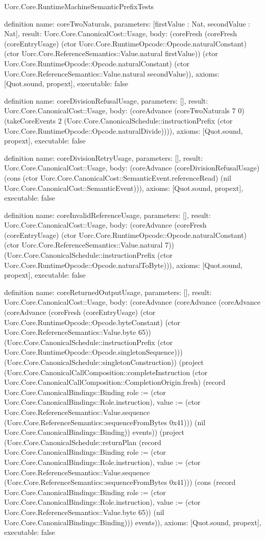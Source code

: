 \begin{lexlean}{Uorc.Core.RuntimeMachineSemanticPrefixTests}
\begin{semanticmodule}
definition{
  name: coreTwoNaturals,
  parameters: [firstValue : Nat, secondValue : Nat],
  result: Uorc.Core.CanonicalCost::Usage,
  body: (coreFresh (coreFresh (coreEntryUsage) (ctor Uorc.Core.RuntimeOpcode::Opcode.naturalConstant) (ctor Uorc.Core.ReferenceSemantics::Value.natural firstValue)) (ctor Uorc.Core.RuntimeOpcode::Opcode.naturalConstant) (ctor Uorc.Core.ReferenceSemantics::Value.natural secondValue)),
  axioms: [Quot.sound, propext],
  executable: false
}

definition{
  name: coreDivisionRefusalUsage,
  parameters: [],
  result: Uorc.Core.CanonicalCost::Usage,
  body: (coreAdvance (coreTwoNaturals 7 0) (takeCoreEvents 2 (Uorc.Core.CanonicalSchedule::instructionPrefix (ctor Uorc.Core.RuntimeOpcode::Opcode.naturalDivide)))),
  axioms: [Quot.sound, propext],
  executable: false
}

definition{
  name: coreDivisionRetryUsage,
  parameters: [],
  result: Uorc.Core.CanonicalCost::Usage,
  body: (coreAdvance (coreDivisionRefusalUsage) (cons (ctor Uorc.Core.CanonicalCost::SemanticEvent.referenceRead) (nil Uorc.Core.CanonicalCost::SemanticEvent))),
  axioms: [Quot.sound, propext],
  executable: false
}

definition{
  name: coreInvalidReferenceUsage,
  parameters: [],
  result: Uorc.Core.CanonicalCost::Usage,
  body: (coreAdvance (coreFresh (coreEntryUsage) (ctor Uorc.Core.RuntimeOpcode::Opcode.naturalConstant) (ctor Uorc.Core.ReferenceSemantics::Value.natural 7)) (Uorc.Core.CanonicalSchedule::instructionPrefix (ctor Uorc.Core.RuntimeOpcode::Opcode.naturalToByte))),
  axioms: [Quot.sound, propext],
  executable: false
}

definition{
  name: coreReturnedOutputUsage,
  parameters: [],
  result: Uorc.Core.CanonicalCost::Usage,
  body: (coreAdvance (coreAdvance (coreAdvance (coreAdvance (coreFresh (coreEntryUsage) (ctor Uorc.Core.RuntimeOpcode::Opcode.byteConstant) (ctor Uorc.Core.ReferenceSemantics::Value.byte 65)) (Uorc.Core.CanonicalSchedule::instructionPrefix (ctor Uorc.Core.RuntimeOpcode::Opcode.singletonSequence))) (Uorc.Core.CanonicalSchedule::singletonConstruction)) (project (Uorc.Core.CanonicalCallComposition::completeInstruction (ctor Uorc.Core.CanonicalCallComposition::CompletionOrigin.fresh) (record Uorc.Core.CanonicalBindings::Binding {role := (ctor Uorc.Core.CanonicalBindings::Role.instruction), value := (ctor Uorc.Core.ReferenceSemantics::Value.sequence (Uorc.Core.ReferenceSemantics::sequenceFromBytes 0x41))}) (nil Uorc.Core.CanonicalBindings::Binding)) events)) (project (Uorc.Core.CanonicalSchedule::returnPlan (record Uorc.Core.CanonicalBindings::Binding {role := (ctor Uorc.Core.CanonicalBindings::Role.instruction), value := (ctor Uorc.Core.ReferenceSemantics::Value.sequence (Uorc.Core.ReferenceSemantics::sequenceFromBytes 0x41))}) (cons (record Uorc.Core.CanonicalBindings::Binding {role := (ctor Uorc.Core.CanonicalBindings::Role.instruction), value := (ctor Uorc.Core.ReferenceSemantics::Value.byte 65)}) (nil Uorc.Core.CanonicalBindings::Binding))) events)),
  axioms: [Quot.sound, propext],
  executable: false
}


\end{semanticmodule}
\end{lexlean}
